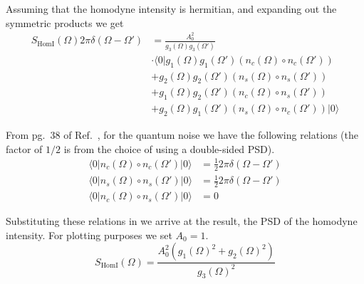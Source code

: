 \documentclass[aps,pra,superscriptaddress,reprint,nofootinbib]{revtex4-1}
\begin{document}
Assuming that the homodyne intensity is hermitian, and expanding out the symmetric products we get
\begin{align}
S_\mathrm{HomI}(\Omega) 2 \pi \delta(\Omega - \Omega') &= \frac{A_0^2}{g_3(\Omega) g_3(\Omega')} \\
&\cdot \langle0| g_1(\Omega) g_1(\Omega') (n_c(\Omega) \circ n_c(\Omega'))\nonumber\\
&+ g_2(\Omega) g_2(\Omega') (n_s(\Omega) \circ n_s(\Omega')) \nonumber\\
&+ g_1(\Omega) g_2(\Omega') (n_c(\Omega) \circ n_s(\Omega'))\nonumber \\
&+ g_2(\Omega) g_1(\Omega') (n_s(\Omega) \circ n_c(\Omega')) |0\rangle\nonumber
\end{align}


From pg.~38 of Ref.~\cite{Danilishin_2012}, for the quantum noise we have the following relations (the factor of $1/2$ is from the choice of using a double-sided PSD).
\begin{align}
\langle0|n_c(\Omega) \circ n_c(\Omega')|0\rangle &= \frac{1}{2} 2 \pi \delta(\Omega - \Omega') \\
\langle0|n_s(\Omega) \circ n_s(\Omega')|0\rangle &= \frac{1}{2} 2 \pi \delta(\Omega - \Omega') \nonumber\\
\langle0|n_c(\Omega) \circ n_s(\Omega')|0\rangle &= 0\nonumber
\end{align}

Substituting these relations in we arrive at the result, the PSD of the homodyne intensity. For plotting purposes we set $A_0 = 1$.
\begin{equation}
S_\mathrm{HomI}(\Omega) = \frac{A_0^2 \left( g_1(\Omega)^2 + g_2(\Omega)^2 \right)}{g_3(\Omega)^2}
\end{equation}


\nocite{*}


\end{document}
